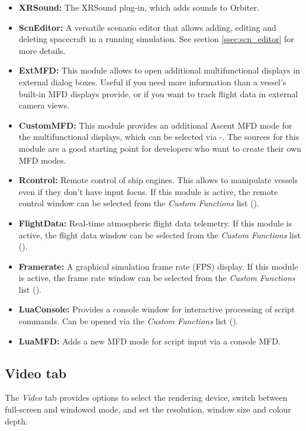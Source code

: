 \documentclass[Orbiter User Manual.tex]{subfiles}
\begin{document}
\begin{itemize}
\item \textbf{XRSound:} The XRSound plug-in, which adds sounds to Orbiter.
\item \textbf{ScnEditor:} A versatile scenario editor that allows adding, editing and deleting spacecraft in a running simulation. See section \ref{ssec:scn_editor} for more details.
\item \textbf{ExtMFD:} This module allows to open additional multifunctional displays in external dialog boxes. Useful if you need more information than a vessel's built-in MFD displays provide, or if you want to track flight data in external camera views.
\item \textbf{CustomMFD:} This module provides an additional Ascent MFD mode for the multifunctional displays, which can be selected via \Shift{}-\Shift{}. The sources for this module are a good starting point for developers who want to create their own MFD modes.
\item \textbf{Rcontrol:} Remote control of ship engines. This allows to manipulate vessels even if they don't have input focus. If this module is active, the remote control window can be selected from the \textit{Custom Functions} list (\Ctrl{}).
\item \textbf{FlightData:} Real-time atmospheric flight data telemetry. If this module is active, the flight data window can be selected from the \textit{Custom Functions} list (\Ctrl{}).
\item \textbf{Framerate:} A graphical simulation frame rate (FPS) display. If this module is active, the frame rate window can be selected from the \textit{Custom Functions} list (\Ctrl{}).
\item \textbf{LuaConsole:} Provides a console window for interactive processing of script commands. Can be opened via the \textit{Custom Functions} list (\Ctrl{}).
\item \textbf{LuaMFD:} Adds a new MFD mode for script input via a console MFD.
\end{itemize}


\subsection{Video tab}
\label{ssec:launchpad_video}
The \textit{Video} tab provides options to select the rendering device, switch between full-screen and windowed mode, and set the resolution, window size and colour depth.
\end{document}
